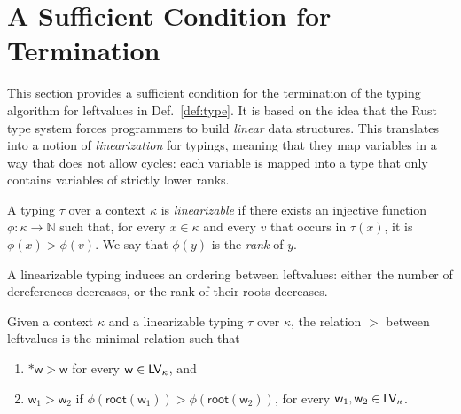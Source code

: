 \section{A Sufficient Condition for Termination}\label{sec:termination}

This section provides a sufficient condition for the termination of the
typing algorithm for leftvalues in Def.~\ref{def:type}. It is based on the
idea that the Rust type system forces programmers to build
\emph{linear} data structures. This translates into a notion of
\emph{linearization} for typings, meaning that they map
variables in a way that does not allow cycles: each variable is mapped
into a type that only contains variables of strictly lower ranks.

\begin{definition}\label{def:linearization}
  A typing $\tau$ over a context $\kappa$ is \emph{linearizable} if there exists
  an injective function $\phi:\kappa\to\mathbb{N}$ such that, for every $x\in\kappa$ and every
  $v$ that occurs in $\tau(x)$, it is $\phi(x)>\phi(v)$. We say that $\phi(y)$ is the \emph{rank} of $y$.
\end{definition}

A linearizable typing induces an ordering between leftvalues: either
the number of dereferences decreases, or the rank of their roots decreases.

\begin{definition}\label{def:ordering}
  Given a context $\kappa$ and a linearizable typing $\tau$ over $\kappa$, the
  relation $>$ between leftvalues is the minimal relation such that
  \begin{enumerate}
  \item $\mathtt{*}\mathsf{w}>\mathsf{w}$ for every $\mathsf{w}\in\mathsf{LV}_\kappa$, and
  \item $\mathsf{w}_1>\mathsf{w}_2$ if
    $\phi(\mathsf{root}(\mathsf{w}_1))>\phi(\mathsf{root}(\mathsf{w}_2))$,
    for every $\mathsf{w}_1,\mathsf{w}_2\in\mathsf{LV}_\kappa$.
  \end{enumerate}
\end{definition}

